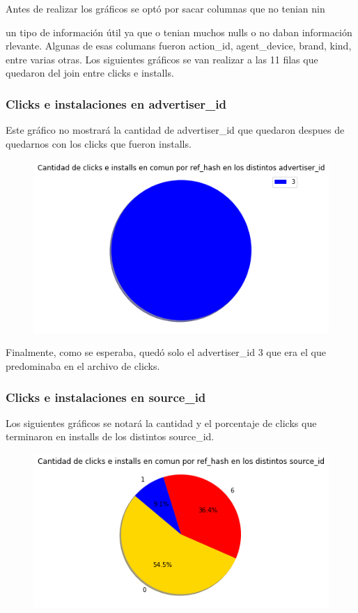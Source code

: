 \documentclass[a4paper, 12pt]{article}
\newcommand\tab[1][1cm]{\hspace*{#1}}
\begin{document}
	 \tab Antes de realizar los gráficos se optó por sacar columnas que no tenian nin{un tipo de información útil ya que o tenian muchos nulls o no daban información rlevante. Algunas de esas columans fueron action\_id, agent\_device, brand, kind, entre varias otras. Los siguientes gráficos se van realizar a las 11 filas que quedaron del join entre clicks e installs.	 

	\subsubsection{Clicks e instalaciones en advertiser\_id}
	\tab Este gráfico no mostrará la cantidad de advertiser\_id que quedaron despues de quedarnos con los clicks que fueron installs.
	
	\FloatBarrier
		\begin{figure}[h]
			\centering
			\includegraphics[width=\textwidth]{images/clicks-installs/advertiser_id.png}
			\caption{}
		\end{figure}
	\FloatBarrier
		
	\tab Finalmente, como se esperaba, quedó solo el advertiser\_id 3 que era el que predominaba en el archivo de clicks.
	
	\subsubsection{Clicks e instalaciones en source\_id}
	\tab Los siguientes gráficos se notará la cantidad y el porcentaje de clicks que terminaron en installs de los distintos source\_id.
	
	\FloatBarrier
		\begin{figure}[h]
			\centering
			\includegraphics[width=\textwidth]{images/clicks-installs/source_id.png}
			\caption{}
		\end{figure}
	\FloatBarrier
	
}
\end{document}
